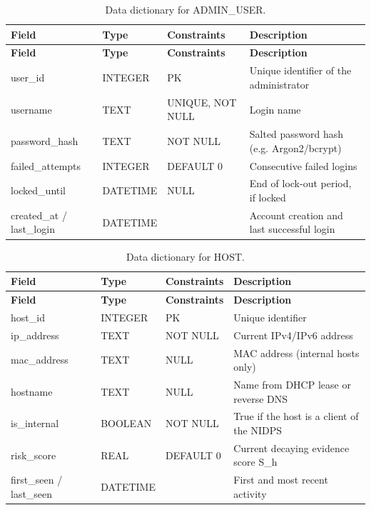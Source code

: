 {\small
\begin{longtable}{|>{\raggedright\arraybackslash}p{}|>{\raggedright\arraybackslash}p{}|>{\raggedright\arraybackslash}p{}|>{\raggedright\arraybackslash}p{}|}
\caption{Data dictionary for ADMIN\_USER.}\label{tab:4.17}\\
\hline
\textbf{Field} & \textbf{Type} & \textbf{Constraints} & \textbf{Description} \\ \hline
\endfirsthead
\hline
\textbf{Field} & \textbf{Type} & \textbf{Constraints} & \textbf{Description} \\ \hline
\endhead
user\_id & INTEGER & PK & Unique identifier of the administrator \\ \hline
username & TEXT & UNIQUE, NOT NULL & Login name \\ \hline
password\_hash & TEXT & NOT NULL & Salted password hash (e.g. Argon2/bcrypt) \\ \hline
failed\_attempts & INTEGER & DEFAULT 0 & Consecutive failed logins \\ \hline
locked\_until & DATETIME & NULL & End of lock-out period, if locked \\ \hline
created\_at / last\_login & DATETIME &  & Account creation and last successful login \\ \hline
\end{longtable}
}

{\small
\begin{longtable}{|>{\raggedright\arraybackslash}p{}|>{\raggedright\arraybackslash}p{}|>{\raggedright\arraybackslash}p{}|>{\raggedright\arraybackslash}p{}|}
\caption{Data dictionary for HOST.}\label{tab:4.18}\\
\hline
\textbf{Field} & \textbf{Type} & \textbf{Constraints} & \textbf{Description} \\ \hline
\endfirsthead
\hline
\textbf{Field} & \textbf{Type} & \textbf{Constraints} & \textbf{Description} \\ \hline
\endhead
host\_id & INTEGER & PK & Unique identifier \\ \hline
ip\_address & TEXT & NOT NULL & Current IPv4/IPv6 address \\ \hline
mac\_address & TEXT & NULL & MAC address (internal hosts only) \\ \hline
hostname & TEXT & NULL & Name from DHCP lease or reverse DNS \\ \hline
is\_internal & BOOLEAN & NOT NULL & True if the host is a client of the NIDPS \\ \hline
risk\_score & REAL & DEFAULT 0 & Current decaying evidence score S\_h \\ \hline
first\_seen / last\_seen & DATETIME &  & First and most recent activity \\ \hline
\end{longtable}
}

